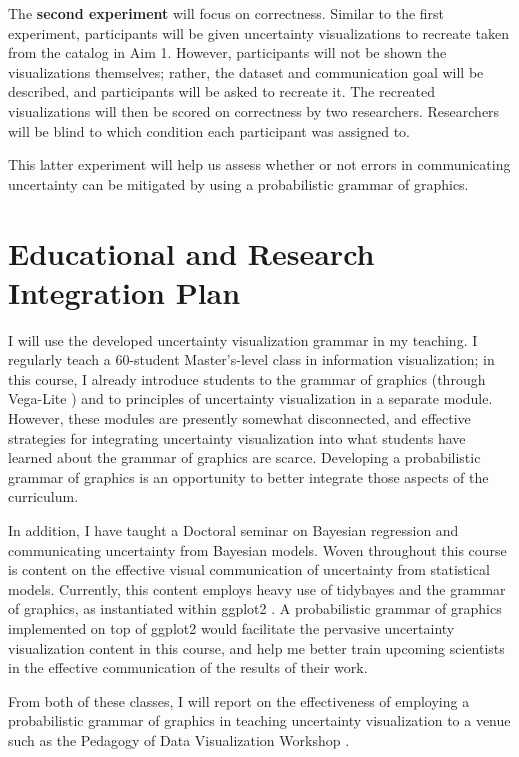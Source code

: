 \documentclass[11pt]{article}
\begin{document}
The \textbf{second experiment} will focus on correctness. Similar to the first experiment, participants will be given uncertainty visualizations to recreate taken from the catalog in Aim 1. However, participants will not be shown the visualizations themselves; rather, the dataset and communication goal will be described, and participants will be asked to recreate it. The recreated visualizations will then be scored on correctness by two researchers. Researchers will be blind to which condition each participant was assigned to.

This latter experiment will help us assess whether or not errors in communicating uncertainty can be mitigated by using a probabilistic grammar of graphics.


\section{Educational and Research Integration Plan}

\noindent I will use the developed uncertainty visualization grammar in my teaching. I regularly teach a 60-student Master's-level class in information visualization; in this course, I already introduce students to the
grammar of graphics (through Vega-Lite \cite{Satyanarayan2017vegalite}) and to principles of uncertainty visualization in a separate module. However, these modules are presently somewhat disconnected, and effective strategies for
integrating uncertainty visualization into what students have learned about the grammar of graphics are scarce. Developing a probabilistic grammar of graphics is an opportunity to better integrate those aspects
of the curriculum.

In addition, I have taught a Doctoral seminar on Bayesian regression and communicating uncertainty from Bayesian models. Woven throughout this course is content on the effective visual communication of uncertainty
from statistical models. Currently, this content employs heavy use of tidybayes \cite{kay2017tidybayes} and the grammar of graphics, as instantiated within ggplot2 \cite{wickham2016ggplot2}. A probabilistic grammar of graphics implemented on top of ggplot2 would facilitate the pervasive uncertainty visualization content in this course, and help me better train upcoming scientists in the effective communication of the results of their work.

From both of these classes, I will report on the effectiveness of employing a probabilistic grammar of graphics in teaching uncertainty visualization to a venue such as the Pedagogy of Data Visualization Workshop \cite{pdvw}.
\end{document}

